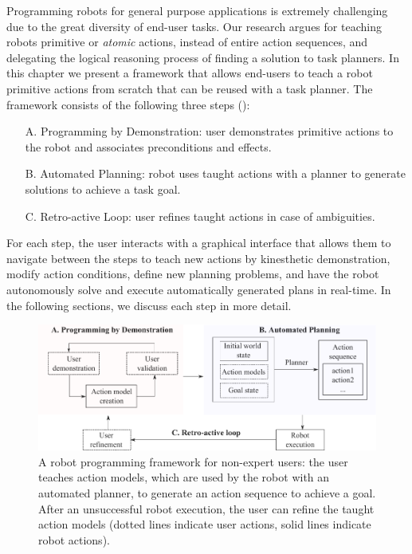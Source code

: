 Programming robots for general purpose applications is extremely challenging due to the great diversity of end-user tasks.
Our research argues for teaching robots primitive or \textit{atomic} actions, instead of entire action sequences, and delegating the logical reasoning process of finding a solution to task planners.
In this chapter we present a framework that allows end-users to teach a robot primitive actions from scratch that can be reused with a task planner.
The framework consists of the following three steps (): 
\begin{enumerate}
	\item[A.]{Programming by Demonstration: user demonstrates primitive actions to the robot and associates preconditions and effects.}
	\item[B.]{Automated Planning: robot uses taught actions with a planner to generate solutions to achieve a task goal.}
	\item[C.]{Retro-active Loop: user refines taught actions in case of ambiguities.}
\end{enumerate}
For each step, the user interacts with a graphical interface that allows them to navigate between the steps to teach new actions by kinesthetic demonstration, modify action conditions, define new planning problems, and have the robot autonomously solve and execute automatically generated plans in real-time.
In the following sections, we discuss each step in more detail. 

\begin{figure}[!h]
	\centering
	\includegraphics[width=\linewidth]{figures/framework}
	\caption{A robot programming framework for non-expert users: the user teaches action models, which are used by the robot with an automated planner, to generate an action sequence to achieve a goal.
After an unsuccessful robot execution, the user can refine the taught action models (dotted lines indicate user actions, solid lines indicate robot actions).}
	\label{fig:framework}
\end{figure}

